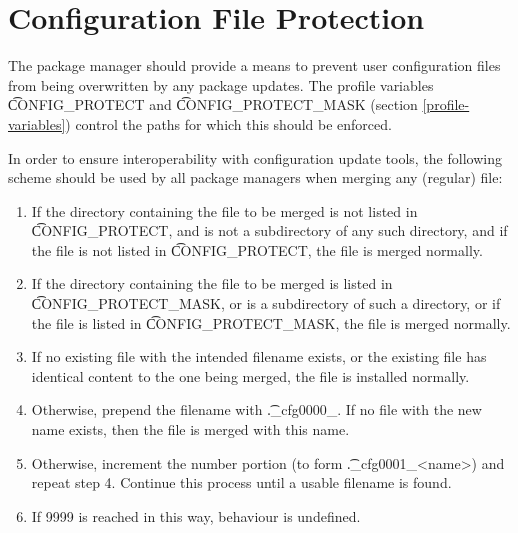 \chapter{Configuration File Protection}
\label{config-protect}

The package manager should provide a means to prevent user configuration files from being
overwritten by any package updates. The profile variables \t{CONFIG\_PROTECT} and
\t{CONFIG\_PROTECT\_MASK} (section \ref{profile-variables}) control the paths for which this
should be enforced.

In order to ensure interoperability with configuration update tools, the following scheme should be
used by all package managers when merging any (regular) file:

\begin{enumerate}
\item If the directory containing the file to be merged is not listed in \t{CONFIG\_PROTECT}, and
     is not a subdirectory of any such directory, and if the file is not listed in \t{CONFIG\_PROTECT},
     the file is merged normally.
\item If the directory containing the file to be merged is listed in \t{CONFIG\_PROTECT\_MASK}, or
    is a subdirectory of such a directory, or if the file is listed in \t{CONFIG\_PROTECT\_MASK},
    the file is merged normally.
\item If no existing file with the intended filename exists, or the existing file has identical
    content to the one being merged, the file is installed normally.
\item Otherwise, prepend the filename with \t{.\_cfg0000\_}. If no file with the new name exists,
    then the file is merged with this name.
\item Otherwise, increment the number portion (to form \t{.\_cfg0001\_<name>}) and repeat step 4.
    Continue this process until a usable filename is found.
\item If 9999 is reached in this way, behaviour is undefined.
\end{enumerate}

